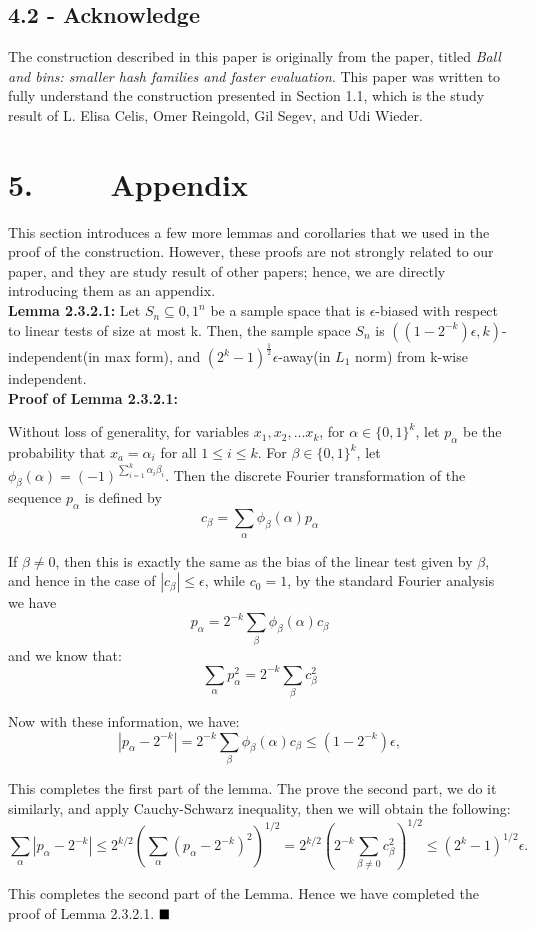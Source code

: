 \documentclass[a4paper, english]{paper}
\begin{document}
	 \subsection{4.2 - Acknowledge} 
	 The construction described in this paper is originally from the paper, titled \textit{Ball and bins: smaller hash families and faster evaluation}. This paper was written to fully understand the construction presented in Section 1.1, which is the study result of L. Elisa Celis, Omer Reingold, Gil Segev, and Udi Wieder. 
	 \newpage
	\section {5. $\qquad$ Appendix }
	This section introduces a few more lemmas and corollaries that we used in the proof of the construction. However, these proofs are not strongly related to our paper, and they are study result of other papers; hence, we are directly introducing them as an appendix. \\
	 
	\noindent\textbf{Lemma 2.3.2.1:} Let $S_n\subseteq{0,1}^n$ be a sample space that is $\epsilon$-biased with respect to linear tests of size at most k. Then, the sample space $S_n$ is $((1-2^{-k})\epsilon,k)$-independent(in max form), and $(2^k-1)^{\frac12}\epsilon$-away(in $L_1$ norm) from k-wise independent.\\
	
	\noindent\textbf{Proof of Lemma 2.3.2.1:} \par
	\noindent Without loss of generality, for variables $x_1, x_2, ...x_k$, for $\alpha \in \{0, 1\}^k$, let $p_{\alpha}$ be the probability that $x_a = \alpha_i$ for all $1 \le i \le k$. For $\beta \in \{0, 1\}^k$, let $\phi_{\beta}(\alpha) = (-1)^{\sum_{i=1}^{k} \alpha_i \beta_i}$. Then the discrete Fourier transformation of the sequence $p_{\alpha}$ is defined by 
	$$ c_{\beta} = \sum_{\alpha} \phi_{\beta}(\alpha)p_{\alpha}$$\par
	If $\beta \ne 0$, then this is exactly the same as the bias of the linear test given by $\beta$, and hence in the case of $|c_{\beta}| \le \epsilon$, while $c_0 = 1$, by the standard Fourier analysis we have 
	$$p_{\alpha} = 2^{-k} \sum_{\beta}\phi_{\beta}(\alpha)c_{\beta}$$ 
	and we know that:
	$$ \sum_{\alpha} p^2_{\alpha} = 2^{-k} \sum_{\beta}c^2_{\beta}$$ \par
	Now with these information, we have:
	$$ |p_{\alpha} - 2^{-k}| = 2^{-k} \sum_{\beta}\phi_{\beta}(\alpha)c_{\beta} \le (1-2^{-k})\epsilon, $$\par
	This completes the first part of the lemma. The prove the second part, we do it similarly, and apply Cauchy-Schwarz inequality, then we will obtain the following:
	$$\sum_{\alpha}|p_{\alpha} - 2^{-k}| \le 2^{k/2}(\sum_{\alpha} (p_{\alpha} - 2^{-k})^2)^{1/2} = 2^{k/2}(2^{-k}\sum_{\beta \ne 0} c^2_{\beta})^{1/2} \le (2^k-1)^{1/2}\epsilon. $$\par
	This completes the second part of the Lemma. Hence we have completed the proof of Lemma 2.3.2.1. $\hfill\blacksquare$ \\
	
\end{document}
